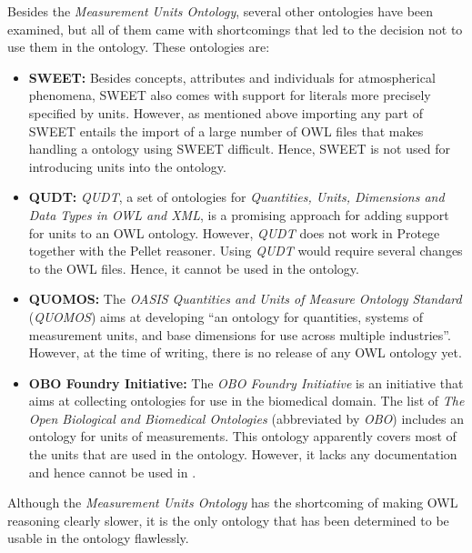 Besides the \emph{Measurement Units Ontology}, several other ontologies have been examined, but all of them came with shortcomings that led to the decision not to use them in the \thinkhomeweather ontology. These ontologies are:
\begin{itemize}
  \item \textbf{SWEET:} Besides concepts, attributes and individuals for atmospherical phenomena, SWEET also comes with support for literals more precisely specified by units. However, as mentioned above importing any part of SWEET entails the import of a large number of OWL files that makes handling a ontology using SWEET difficult. Hence, SWEET is not used for introducing units into the \thinkhomeweather ontology.
  \item \textbf{QUDT:} \emph{QUDT}, a set of ontologies for \emph{Quantities, Units, Dimensions and Data Types in OWL and XML}, is a promising approach for adding support for units to an OWL ontology. However, \emph{QUDT} does not work in Protege together with the Pellet reasoner. Using \emph{QUDT} would require several changes to the OWL files. Hence, it cannot be used in the \thinkhomeweather ontology. %
  \item \textbf{QUOMOS:} The \emph{OASIS Quantities and Units of Measure Ontology Standard} (\emph{QUOMOS}) aims at developing ``an ontology for quantities, systems of measurement units, and base dimensions for use across multiple industries''. However, at the time of writing, there is no release of any OWL ontology yet. %
  \item \textbf{OBO Foundry Initiative:} The \emph{OBO Foundry Initiative} is an initiative that aims at collecting ontologies for use in the biomedical domain. The list of \emph{The Open Biological and Biomedical Ontologies} (abbreviated by \emph{OBO}) includes an ontology for units of measurements. This ontology apparently covers most of the units that are used in the \thinkhomeweather ontology. However, it lacks any documentation and hence cannot be used in \thinkhomeweather. %
\end{itemize}
Although the \emph{Measurement Units Ontology} has the shortcoming of making OWL reasoning clearly slower, it is the only ontology that has been determined to be usable in the \thinkhomeweather ontology flawlessly.

